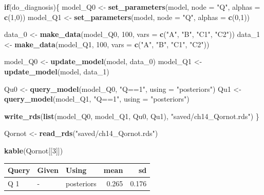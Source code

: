 \documentclass[12pt,]{book}
\newenvironment{Shaded}{\begin{snugshade}}{\end{snugshade}}
\newcommand{\ControlFlowTok}[1]{\textcolor[rgb]{0.13,0.29,0.53}{\textbf{#1}}}
\newcommand{\DataTypeTok}[1]{\textcolor[rgb]{0.13,0.29,0.53}{#1}}
\newcommand{\DecValTok}[1]{\textcolor[rgb]{0.00,0.00,0.81}{#1}}
\newcommand{\KeywordTok}[1]{\textcolor[rgb]{0.13,0.29,0.53}{\textbf{#1}}}
\newcommand{\NormalTok}[1]{#1}
\newcommand{\StringTok}[1]{\textcolor[rgb]{0.31,0.60,0.02}{#1}}
\begin{document}
\begin{Shaded}
\begin{Highlighting}[]
\ControlFlowTok{if}\NormalTok{(do_diagnosis)\{}
\NormalTok{  model_Q0 <-}\StringTok{ }\KeywordTok{set_parameters}\NormalTok{(model, }\DataTypeTok{node =} \StringTok{"Q"}\NormalTok{, }\DataTypeTok{alphas =} \KeywordTok{c}\NormalTok{(}\DecValTok{1}\NormalTok{,}\DecValTok{0}\NormalTok{))}
\NormalTok{  model_Q1 <-}\StringTok{ }\KeywordTok{set_parameters}\NormalTok{(model, }\DataTypeTok{node =} \StringTok{"Q"}\NormalTok{, }\DataTypeTok{alphas =} \KeywordTok{c}\NormalTok{(}\DecValTok{0}\NormalTok{,}\DecValTok{1}\NormalTok{))}
  
\NormalTok{  data_}\DecValTok{0}\NormalTok{ <-}\StringTok{ }\KeywordTok{make_data}\NormalTok{(model_Q0, }\DecValTok{100}\NormalTok{, }\DataTypeTok{vars =} \KeywordTok{c}\NormalTok{(}\StringTok{"A"}\NormalTok{, }\StringTok{"B"}\NormalTok{, }\StringTok{"C1"}\NormalTok{, }\StringTok{"C2"}\NormalTok{))}
\NormalTok{  data_}\DecValTok{1}\NormalTok{ <-}\StringTok{ }\KeywordTok{make_data}\NormalTok{(model_Q1, }\DecValTok{100}\NormalTok{, }\DataTypeTok{vars =} \KeywordTok{c}\NormalTok{(}\StringTok{"A"}\NormalTok{, }\StringTok{"B"}\NormalTok{, }\StringTok{"C1"}\NormalTok{, }\StringTok{"C2"}\NormalTok{))}
  
\NormalTok{  model_Q0 <-}\StringTok{ }\KeywordTok{update_model}\NormalTok{(model, data_}\DecValTok{0}\NormalTok{)}
\NormalTok{  model_Q1 <-}\StringTok{ }\KeywordTok{update_model}\NormalTok{(model, data_}\DecValTok{1}\NormalTok{)}

\NormalTok{Qu0 <-}\StringTok{ }\KeywordTok{query_model}\NormalTok{(model_Q0, }\StringTok{"Q==1"}\NormalTok{, }\DataTypeTok{using =} \StringTok{"posteriors"}\NormalTok{)}
\NormalTok{Qu1 <-}\StringTok{ }\KeywordTok{query_model}\NormalTok{(model_Q1, }\StringTok{"Q==1"}\NormalTok{, }\DataTypeTok{using =} \StringTok{"posteriors"}\NormalTok{)}

  \KeywordTok{write_rds}\NormalTok{(}\KeywordTok{list}\NormalTok{(model_Q0, model_Q1, Qu0, Qu1), }\StringTok{"saved/ch14_Qornot.rds"}\NormalTok{)}
\NormalTok{\}}

\NormalTok{Qornot <-}\StringTok{ }\KeywordTok{read_rds}\NormalTok{(}\StringTok{"saved/ch14_Qornot.rds"}\NormalTok{)}

\KeywordTok{kable}\NormalTok{(Qornot[[}\DecValTok{3}\NormalTok{]])}
\end{Highlighting}
\end{Shaded}

\begin{tabular}{l|l|l|r|r}
\hline
Query & Given & Using & mean & sd\\
\hline
Q 1 & - & posteriors & 0.265 & 0.176\\
\hline
\end{tabular}
\end{document}
